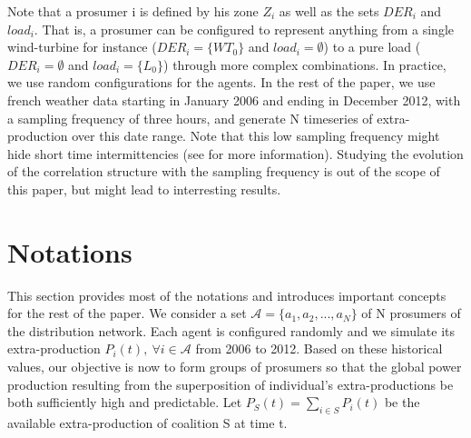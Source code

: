 \documentclass[journal]{IEEEtran}
\begin{document}
Note that a prosumer i is defined by his zone $ Z_{i} $ as well as the sets $ DER_{i} $ and $ load_{i} $. That is, a prosumer can be configured to represent anything from a single wind-turbine for instance ($ DER_{i} = \{ WT_{0} \} $ and $ load_{i} = \emptyset $) to a pure load ($ DER_{i} = \emptyset $ and $ load_{i} = \{ L_{0} \} $) through more complex combinations. In practice, we use random configurations for the agents. In the rest of the paper, we use french weather data \cite{Infoclimat} starting in January 2006 and ending in December 2012, with a sampling frequency of three hours, and generate N timeseries of extra-production over this date range. Note that this low sampling frequency might hide short time intermittencies (see \cite{Anvari2015} for more information). Studying the evolution of the correlation structure with the sampling frequency is out of the scope of this paper, but might lead to interresting results.



%
%

\section{Notations}
\label{sec:notations}

This section provides most of the notations and introduces important concepts for the rest of the paper. We consider a set $ \mathcal{A} = \{a_{1},a_{2},...,a_{N} \} $ of N prosumers of the distribution network. Each agent is configured randomly and we simulate its extra-production $ P_{i}(t),\ \forall i \in \mathcal{A} $ from 2006 to 2012. Based on these historical values, our objective is now to form groups of prosumers so that the global power production resulting from the superposition of individual's extra-productions be both sufficiently high and predictable. Let $ P_{S}(t) = \sum_{i \in S} P_{i}(t) $ be the available extra-production of coalition S at time t. 
\end{document}
